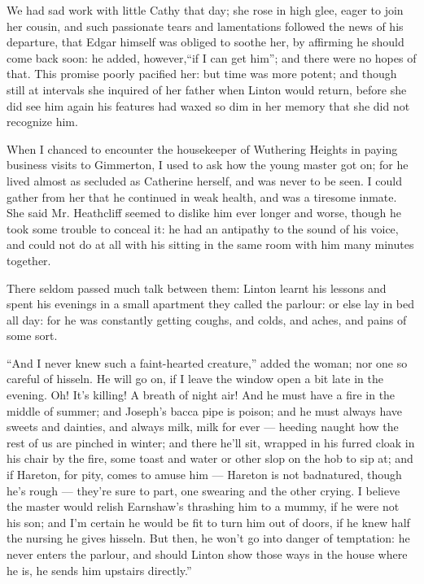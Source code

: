 \par We had sad work with little Cathy that day; she rose in high glee, eager to join her cousin, and such passionate tears and lamentations followed the news of his departure, that Edgar himself was obliged to soothe her, by affirming he should come back soon: he added, however,“if I can get him”; and there were no hopes of that. This promise poorly pacified her: but time was more potent; and though still at intervals she inquired of her father when Linton would return, before she did see him again his features had waxed so dim in her memory that she did not recognize him.
\par When I chanced to encounter the housekeeper of Wuthering Heights in paying business visits to Gimmerton, I used to ask how the young master got on; for he lived almost as secluded as Catherine herself, and was never to be seen. I could gather from her that he continued in weak health, and was a tiresome inmate. She said Mr. Heathcliff seemed to dislike him ever longer and worse, though he took some trouble to conceal it: he had an antipathy to the sound of his voice, and could not do at all with his sitting in the same room with him many minutes together.
\par There seldom passed much talk between them: Linton learnt his lessons and spent his evenings in a small apartment they called the parlour: or else lay in bed all day: for he was constantly getting coughs, and colds, and aches, and pains of some sort.
\par “And I never knew such a faint-hearted creature,” added the woman; nor one so careful of hisseln. He will go on, if I leave the window open a bit late in the evening. Oh! It's killing! A breath of night air! And he must have a fire in the middle of summer; and Joseph's bacca pipe is poison; and he must always have sweets and dainties, and always milk, milk for ever — heeding naught how the rest of us are pinched in winter; and there he'll sit, wrapped in his furred cloak in his chair by the fire, some toast and water or other slop on the hob to sip at; and if Hareton, for pity, comes to amuse him — Hareton is not badnatured, though he's rough — they're sure to part, one swearing and the other crying. I believe the master would relish Earnshaw's thrashing him to a mummy, if he were not his son; and I'm certain he would be fit to turn him out of doors, if he knew half the nursing he gives hisseln. But then, he won't go into danger of temptation: he never enters the parlour, and should Linton show those ways in the house where he is, he sends him upstairs directly.”
